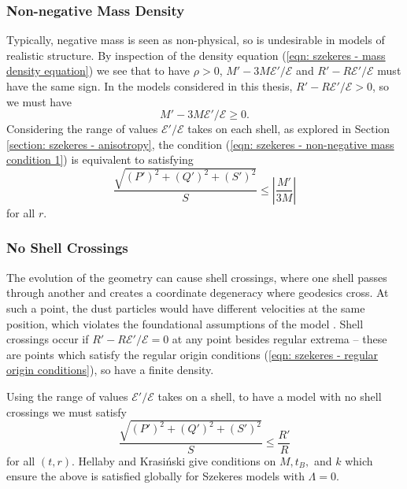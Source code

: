 \documentclass[a4paper,12pt]{report}
\begin{document}
\subsubsection{Non-negative Mass Density}
Typically, negative mass is seen as non-physical, so is undesirable in models of realistic structure. By inspection of the density equation (\ref{eqn: szekeres - mass density equation}) we see that to have $\rho > 0$, $M'-3M\mathcal{E}'/\mathcal{E}$ and $R'-R\mathcal{E}'/\mathcal{E}$ must have the same sign. In the models considered in this thesis, $R'-R\mathcal{E}'/\mathcal{E} > 0$, so we must have
\begin{equation} \label{eqn: szekeres - non-negative mass condition 1}
  M'-3M\mathcal{E}'/\mathcal{E} \geq 0.
\end{equation}
Considering the range of values $\mathcal{E}'/\mathcal{E}$ takes on each shell, as explored in Section \ref{section: szekeres - anisotropy}, the condition (\ref{eqn: szekeres - non-negative mass condition 1}) is equivalent to satisfying
\begin{equation}
  \frac{\sqrt{(P')^2 + (Q')^2 + (S')^2}}{S} \leq \left|\frac{M'}{3M}\right|
\end{equation}
for all $r$.

\subsubsection{No Shell Crossings}
The evolution of the geometry can cause shell crossings, where one shell passes through another and creates a coordinate degeneracy where geodesics cross. At such a point, the dust particles would have different velocities at the same position, which violates the foundational assumptions of the model \cite{RN144,RN1}. Shell crossings occur if $R'-R\mathcal{E}'/\mathcal{E} = 0$ at any point besides regular extrema -- these are points which satisfy the regular origin conditions (\ref{eqn: szekeres - regular origin conditions}), so have a finite density.

Using the range of values $\mathcal{E}'/\mathcal{E}$ takes on a shell, to have a model with no shell crossings we must satisfy
\begin{equation}\label{eqn: no shell crossings condition}
  \frac{\sqrt{(P')^2 + (Q')^2 + (S')^2}}{S} \leq \frac{R'}{R}
\end{equation}
for all $(t,r)$. Hellaby and Krasi\'nski \cite{RN143} give conditions on $M, t_B,$ and $k$ which ensure the above is satisfied globally for Szekeres models with $\Lambda=0$.
\end{document}

